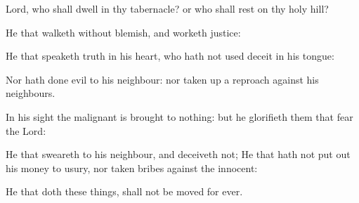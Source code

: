 \item Lord, who shall dwell in thy tabernacle? or who shall rest on thy holy hill?
\item He that walketh without blemish, and worketh justice:
\item He that speaketh truth in his heart, who hath not used deceit in his tongue:
\item Nor hath done evil to his neighbour: nor taken up a reproach against his neighbours.
\item In his sight the malignant is brought to nothing: but he glorifieth them that fear the Lord:
\item He that sweareth to his neighbour, and deceiveth not; He that hath not put out his money to usury, nor taken bribes against the innocent:
\item He that doth these things, shall not be moved for ever.
